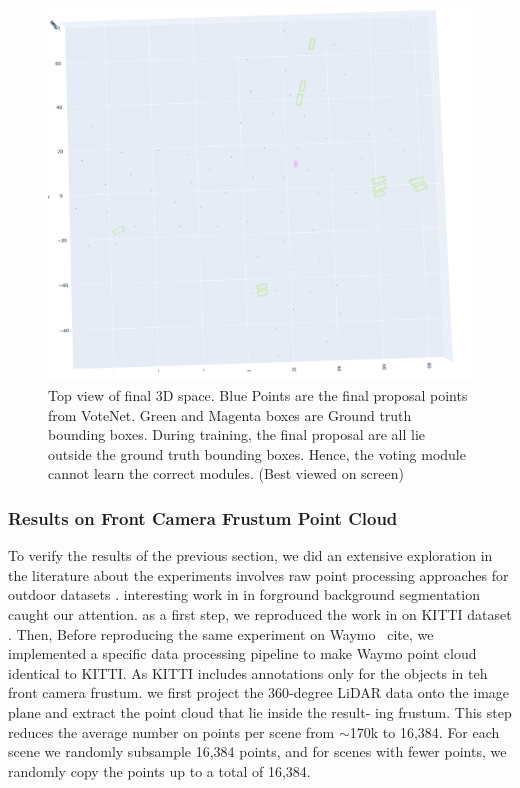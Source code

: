 \documentclass[10pt,twocolumn,letterpaper]{article}
\begin{document}
\begin{figure}
	\includegraphics[width=\linewidth]{media/votenet_proposal_points.png}
   \caption{Top view of final 3D space. Blue Points are the final proposal points from VoteNet. Green and Magenta boxes are Ground truth bounding boxes. During training, the final proposal are all lie outside the ground truth bounding boxes. Hence, the voting module cannot learn the correct modules. (Best viewed on screen)}
\label{fig:proposal_points}
\end{figure}

\subsubsection{Results on Front Camera Frustum Point Cloud}
To verify the results of the previous section, we did an extensive exploration in the literature about the experiments involves raw point processing approaches \cite{pointnet, point++, votennet, votenet frustutm, point rcnn} for outdoor datasets \cite{KITTI,  nuscenes, Waymo, a2d2}. interesting work in \cite{point rcnn} in forground background segmentation caught our attention. as a first step, we reproduced the work in \cite{point RCNN} on KITTI dataset \cite{KITTI}. Then, Before reproducing the same experiment on Waymo \ cite{}, we implemented a specific data processing pipeline to make Waymo point cloud identical to KITTI. As KITTI includes annotations only for the objects in teh front camera frustum. we first project the 360-degree LiDAR data onto the image plane and extract the point cloud that lie inside the result- ing frustum. This step reduces the average number on points per scene from $\sim$170k to 16,384. For each scene we randomly subsample 16,384 points, and for scenes with fewer points, we randomly copy the points up to a total of 16,384.
\end{document}
